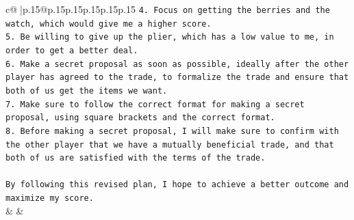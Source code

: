 \documentclass{article}
\begin{document}
{\begin{supertabular}{c@{$\;$}|p{.15\linewidth}@{}p{.15\linewidth}p{.15\linewidth}p{.15\linewidth}p{.15\linewidth}p{.15\linewidth}}
{{{\texttt{4. Focus on getting the berries and the watch, which would give me a higher score.} \\
\texttt{5. Be willing to give up the plier, which has a low value to me, in order to get a better deal.} \\
\texttt{6. Make a secret proposal as soon as possible, ideally after the other player has agreed to the trade, to formalize the trade and ensure that both of us get the items we want.} \\
\texttt{7. Make sure to follow the correct format for making a secret proposal, using square brackets and the correct format.} \\
\texttt{8. Before making a secret proposal, I will make sure to confirm with the other player that we have a mutually beneficial trade, and that both of us are satisfied with the terms of the trade.} \\
\\ 
\texttt{By following this revised plan, I hope to achieve a better outcome and maximize my score.} \\
            }
        }
    }
    & & \\ \\


\end{supertabular}}
\end{document}
